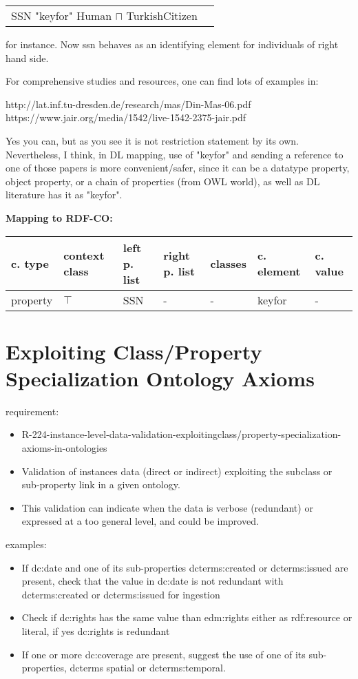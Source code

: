 \documentclass{llncs}
\newenvironment{gcotable}{
  \scriptsize
  \sffamily
  \vspace{0cm}
	\begin{center}
	\textbf{\vspace{0.4cm}Mapping to RDF-CO:} \\
  \begin{tabular}{l|l|l|l|l|l|l}
	\hline
  \textbf{c. type} & \textbf{context class} & \textbf{left p. list} & \textbf{right p. list} & \textbf{classes} & \textbf{c. element} & \textbf{c. value} \\
  \hline

}{
  \hline
  \end{tabular}
	\end{center}
}
\newenvironment{DL}{
  \vspace{0cm}
	\begin{center}
  \begin{tabular}{r l}

}{
  \end{tabular}
	\end{center}
}
\begin{document}
\begin{DL}
SSN "keyfor" Human $\sqcap$ TurkishCitizen
\end{DL}

 for instance. Now ssn behaves as an identifying element for individuals of right hand side.

For comprehensive studies and resources, one can find lots of examples in:

http://lat.inf.tu-dresden.de/research/mas/Din-Mas-06.pdf
https://www.jair.org/media/1542/live-1542-2375-jair.pdf

Yes you can, but as you see it is not restriction statement by its own. Nevertheless, I think, in DL mapping, use of "keyfor" and sending a reference to one of those papers is more convenient/safer, since it can be a datatype property, object property, or a chain of properties (from OWL world), as well as DL literature has it as "keyfor". 

\begin{gcotable}
property & $\top$ & SSN & - & - & keyfor & - \\
\end{gcotable}

\section{Exploiting Class/Property Specialization Ontology Axioms}

requirement:

\begin{itemize}
	\item R-224-instance-level-data-validation-exploitingclass/property-specialization-axioms-in-ontologies
\end{itemize}



\begin{itemize}
  \item Validation of instances data (direct or indirect) exploiting the subclass or sub-property link in a given ontology.
  \item This validation can indicate when the data is verbose (redundant) or expressed at a too general level, and could be improved.
\end{itemize}

examples:

\begin{itemize}
	\item If dc:date and one of its sub-properties dcterms:created or dcterms:issued are present, check that the value in dc:date is not redundant with dcterms:created or dcterms:issued for ingestion
  \item Check if dc:rights has the same value than edm:rights either as rdf:resource or literal, if yes dc:rights is redundant
  \item If one or more dc:coverage are present, suggest the use of one of its sub-properties, dcterms spatial or dcterms:temporal.
\end{itemize}
\end{document}
